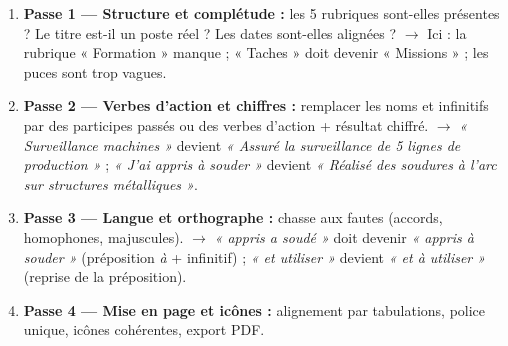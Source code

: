 \documentclass[11pt]{article}
\begin{document}
\begin{methode}
\begin{enumerate}
  \item \textbf{Passe 1 — Structure et complétude :} les 5 rubriques sont-elles présentes ? Le titre est-il un poste réel ? Les dates sont-elles alignées ? $\rightarrow$ Ici : la rubrique « Formation » manque ; « Taches » doit devenir « Missions » ; les puces sont trop vagues.
  \item \textbf{Passe 2 — Verbes d'action et chiffres :} remplacer les noms et infinitifs par des participes passés ou des verbes d'action + résultat chiffré. $\rightarrow$ \emph{« Surveillance machines »} devient \emph{« Assuré la surveillance de 5 lignes de production »} ; \emph{« J'ai appris à souder »} devient \emph{« Réalisé des soudures à l'arc sur structures métalliques »}.
  \item \textbf{Passe 3 — Langue et orthographe :} chasse aux fautes (accords, homophones, majuscules). $\rightarrow$ \emph{« appris a soudé »} doit devenir \emph{« appris à souder »} (préposition \emph{à} + infinitif) ; \emph{« et utiliser »} devient \emph{« et à utiliser »} (reprise de la préposition).
  \item \textbf{Passe 4 — Mise en page et icônes :} alignement par tabulations, police unique, icônes cohérentes, export PDF.
\end{enumerate}
\end{methode}
\end{document}
